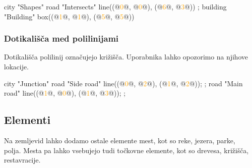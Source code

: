 \documentclass{article}
\newcommand\Num[1]{\textcolor{orange}{#1}}
\begin{document}
\begin{multicols}{2}
\begin{CITY}
  city "Shapes" {
    road "Intersects" {
      line((@\Num{0}@, @\Num{0}@), (@\Num{6}@, @\Num{3}@))
    };
    building "Building" {
      box((@\Num{1}@, @\Num{1}@), (@\Num{5}@, @\Num{5}@))
    }
  }
\end{CITY}

\columnbreak

\end{multicols}


\subsubsection{Dotikališča med polilinijami}
Dotikališča polilinij označujejo križišča.
Uporabnika lahko opozorimo na njihove lokacije.

\begin{multicols}{2}
\begin{CITY}
  city "Junction" {
    road "Side road" {
      line((@\Num{0}@, @\Num{2}@), (@\Num{1}@, @\Num{2}@));
    };
    road "Main road" {
      line((@\Num{1}@, @\Num{0}@), (@\Num{1}@, @\Num{3}@));
    };
  }
\end{CITY}

\columnbreak

\end{multicols}

\newpage

\subsection{Elementi}
Na zemljevid lahko dodamo ostale elemente mest, kot so reke, jezera, parke, polja.
Mesta pa lahko vsebujejo tudi točkovne elemente, kot so drevesa, križišča, restavracije.
\end{document}
